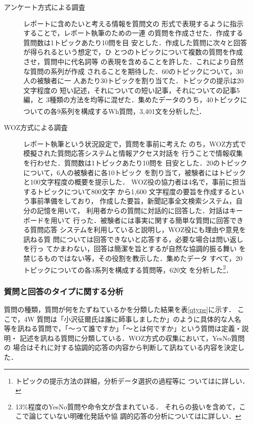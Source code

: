\documentclass[japanese]{jnlp_1.4}
\begin{document}
\begin{description}
\item[アンケート方式による調査]レポートに含めたいと考える情報を質問文の
	   形式で表現するように指示することで，レポート執筆のための一連
	   の質問を作成させた．作成する質問数は1トピックあたり10問を目
	   安とした．作成した質問に次々と回答が得られるという想定で，ひ
	   とつのトピックについて複数の質問を作成させ，質問中に代名詞等
	   の表現を含めることを許した．これにより自然な質問の系列が作成
	   されることを期待した．60のトピックについて，30人の被験者に一
	   人あたり30トピックを割り当てた．トピックの提示は20文字程度の
	   短い記述，それについての短い記事，それについての記事5編，と
	   3種類の方法を均等に混ぜた．集めたデータのうち，40トピックに
	   ついての各9系列を構成するWh質問，3,401文を分析した\footnote{
		トピックの提示方法の詳細，分析データ選択の過程等に
		   ついては\cite{KatoJ04a}に詳しい．
	}．

\item[WOZ方式による調査]レポート執筆という状況設定で，質問を事前に考えた
	   のち，WOZ方式で模擬された質問応答システムと情報アクセス対話を
	   行うことで情報収集を行わせた．質問数は1トピックあたり10問を
	   目安とした．20のトピックについて，6人の被験者に各10トピック
	   を割り当て，被験者にはトピックと100文字程度の概要を提示した．
	   WOZ役の協力者は4名で，事前に担当するトピックについて800文字
	   から1,600 文字程度の要旨を作成するという事前準備をしており，
	   作成した要旨，新聞記事全文検索システム，自分の記憶を用いて，
	   利用者からの質問に対話的に回答した．対話はキーボードを用いて
	   行った．被験者には事実に関する簡単な質問に回答できる質問応答
	   システムを利用していると説明し，WOZ役にも理由や意見を訊ねる質
	   問については回答できないと応答する，必要な場合は問い返しを行っ
	   てかまわない，回答は簡潔を旨とするが自然な協調的振る舞い
	   を禁じるものではない等，その役割を教示した．集めたデータ
	   すべて，20トピックについての各3系列を構成する質問等，620文
	   を分析した\footnote{
		13\%程度のYesNo質問や命令文が含まれている．
		   それらの扱いを含めて，ここで論じていない明確化発話や協
		   調的応答の分析については\cite{Kato06}に詳しい．
	}．
\end{description}



\subsubsection{質問と回答のタイプに関する分析}

質問の種類，質問が何をたずねているかを分類した結果を表\ref{qtype}に示す．
ここで，4W 質問は「小沢征爾氏は誰に師事しましたか」のように具体的な人名
等を訊ねる質問で，「〜って誰ですか」「〜とは何ですか」という質問は定義・説明・
記述を訊ねる質問に分類している．WOZ方式の収集において，YesNo質問の
場合はそれに対する協調的応答の内容から判断して訊ねている内容を決定した．
\end{document}
